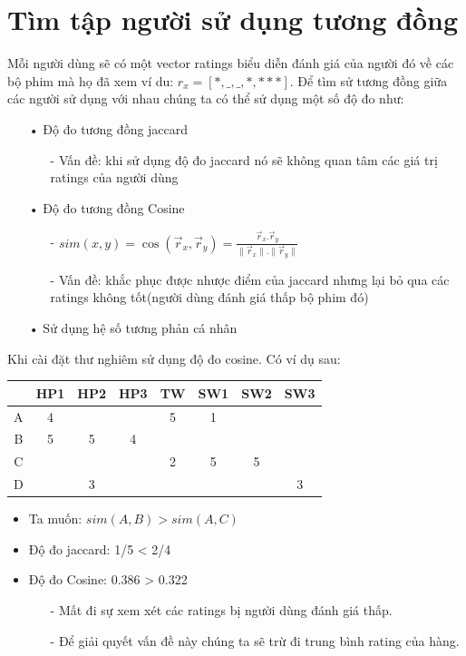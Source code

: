 \documentclass[a4paper,11pt]{report}
\begin{document}
\section{Tìm tập người sử dụng tương đồng}
Mỗi người dùng sẽ có một vector ratings biểu diễn đánh giá của người đó về các bộ phim mà họ đã xem ví du: $r_x = [*,\_,\_,*,***]$. Để tìm sử tương đồng giữa các người sử dụng với nhau chúng ta có thể sử dụng một số độ đo như:
\begin{itemize}
\item[•] Độ đo tương đồng jaccard
\begin{itemize}
\item[-] Vấn đề: khi sử dụng độ đo jaccard nó sẽ không quan tâm các giá trị ratings của người dùng
\end{itemize}
\item[•] Độ đo tương đồng Cosine
\begin{itemize}
\item[-] $sim(x,y) = \cos(\vec{r}_x , \vec{r}_y) = \frac{\vec{r}_x.\vec{r}_y}{\parallel \vec{r}_x \parallel . \parallel \vec{r}_y \parallel}$
\item[-] Vấn đề: khắc phục được nhược điểm của jaccard nhưng lại bỏ qua các ratings không tốt(người dùng đánh giá thấp bộ phim đó)
\end{itemize}
\item[•] Sử dụng hệ số tương phản cá nhân
\end{itemize}
Khi cài đặt thư nghiêm sử dụng độ đo cosine. Có ví dụ sau:
\begin{center}
\begin{longtable}{c|ccccccc}
 & HP1 & HP2 & HP3 & TW & SW1 & SW2 & SW3 \\
 \hline
A & 4 & & & 5 & 1 & \\
B & 5 & 5 & 4 &   &  \\
C &  &   &  & 2 & 5 & 5\\
D &  & 3 &  &  &  &  & 3 \\
\end{longtable}
\end{center}
\begin{itemize}
\item Ta muốn: $sim(A,B) > sim(A,C)$
\item Độ đo jaccard: 1/5 < 2/4
\item Độ đo Cosine: 0.386 > 0.322
\begin{itemize}
\item[-] Mất đi sự xem xét các ratings bị người dùng đánh giá thấp.
\item[-] Để giải quyết vấn đề này chúng ta sẽ trừ đi trung bình rating của hàng.
\end{itemize}
\end{itemize}
\end{document}
